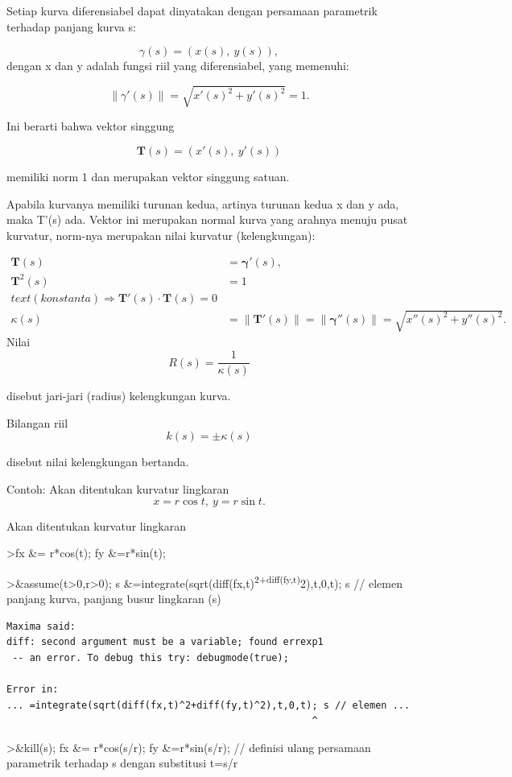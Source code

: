\documentclass[
]{book}
\begin{document}
Setiap kurva diferensiabel dapat dinyatakan dengan persamaan parametrik terhadap panjang kurva s:

\[\gamma(s) = (x(s),\ y(s)),\] dengan x dan y adalah fungsi riil yang diferensiabel, yang memenuhi:

\[\|\gamma'(s)\|=\sqrt{x'(s)^2+y'(s)^2}=1.\]

Ini berarti bahwa vektor singgung

\[\mathbf{T}(s)=(x'(s),\ y'(s))\]

memiliki norm 1 dan merupakan vektor singgung satuan.

Apabila kurvanya memiliki turunan kedua, artinya turunan kedua x dan y ada, maka T'(s) ada. Vektor ini merupakan normal kurva yang arahnya menuju pusat kurvatur, norm-nya merupakan nilai kurvatur (kelengkungan):

\[\begin{aligned}\mathbf{T}(s) &= \mathbf{\gamma}'(s),\\ \mathbf{T}^{2}(s) &=1\\text{(konstanta)}\Rightarrow \mathbf{T}'(s)\cdot \mathbf{T}(s)=0\\ \kappa(s) &=\|\mathbf {T}'(s)\|= \|\mathbf{\gamma}''(s)\|=\sqrt{x''(s)^{2}+y''(s)^{2}}.\end{aligned}\] Nilai \[R(s)=\frac{1}{\kappa(s)}\]

disebut jari-jari (radius) kelengkungan kurva.

Bilangan riil \[k(s) = \pm\kappa(s)\]

disebut nilai kelengkungan bertanda.

Contoh: Akan ditentukan kurvatur lingkaran \[x=r\cos t,\ y= r\sin t.\]

Akan ditentukan kurvatur lingkaran

\textgreater fx \&= r*cos(t); fy \&=r*sin(t);

\textgreater\&assume(t\textgreater0,r\textgreater0); s \&=integrate(sqrt(diff(fx,t)\textsuperscript{2+diff(fy,t)}2),t,0,t); s // elemen panjang kurva, panjang busur lingkaran (s)

\begin{verbatim}
Maxima said:
diff: second argument must be a variable; found errexp1
 -- an error. To debug this try: debugmode(true);

Error in:
... =integrate(sqrt(diff(fx,t)^2+diff(fy,t)^2),t,0,t); s // elemen ...
                                                     ^
\end{verbatim}

\textgreater\&kill(s); fx \&= r*cos(s/r); fy \&=r*sin(s/r); // definisi ulang persamaan parametrik terhadap s dengan substitusi t=s/r
\end{document}
